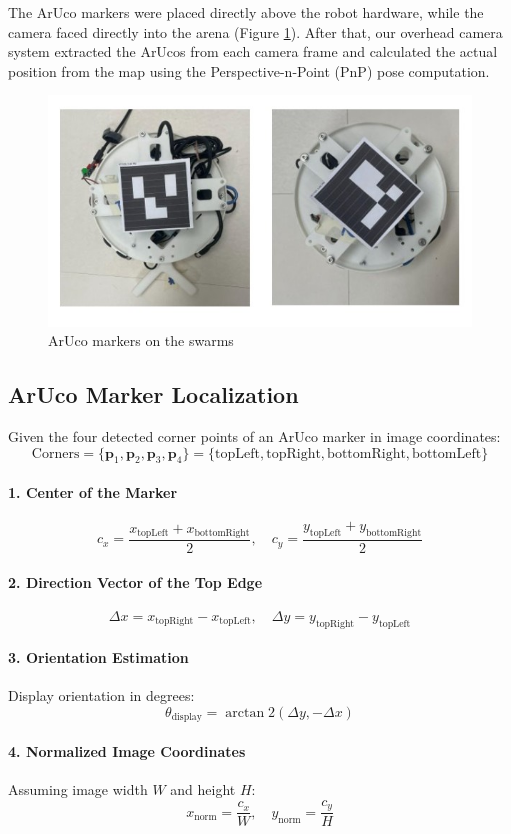 The ArUco markers were placed directly above the robot hardware, while the camera faced directly into the arena (Figure \ref{fig:aruco-swarm}). After that, our overhead camera system extracted the ArUcos from each camera frame and calculated the actual position from the map using the Perspective-n-Point (PnP) pose computation.

\begin{figure}[H]
    \centering
    \includegraphics[width=0.35\linewidth]{assets/images/odometry/aruco.jpg}
    \caption{ArUco markers on the swarms}
    \label{fig:aruco-swarm}
\end{figure}

\subsection*{ArUco Marker Localization}

Given the four detected corner points of an ArUco marker in image coordinates:
\[
\text{Corners} = \{ \mathbf{p}_1, \mathbf{p}_2, \mathbf{p}_3, \mathbf{p}_4 \} = \{ \text{topLeft}, \text{topRight}, \text{bottomRight}, \text{bottomLeft} \}
\]

\paragraph*{1. Center of the Marker}
\[
c_x = \frac{x_{\text{topLeft}} + x_{\text{bottomRight}}}{2}, \quad
c_y = \frac{y_{\text{topLeft}} + y_{\text{bottomRight}}}{2}
\]

\paragraph*{2. Direction Vector of the Top Edge}
\[
\Delta x = x_{\text{topRight}} - x_{\text{topLeft}}, \quad
\Delta y = y_{\text{topRight}} - y_{\text{topLeft}}
\]

\paragraph*{3. Orientation Estimation}
Display orientation in degrees:
\[
\theta_{\text{display}} = \arctan2(\Delta y, -\Delta x)
\]

\paragraph*{4. Normalized Image Coordinates}
Assuming image width $W$ and height $H$:
\[
x_{\text{norm}} = \frac{c_x}{W}, \quad
y_{\text{norm}} = \frac{c_y}{H}
\]


